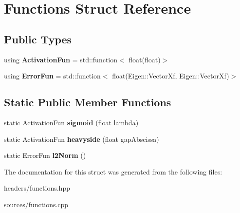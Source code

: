 \hypertarget{structFunctions}{}\section{Functions Struct Reference}
\label{structFunctions}
\subsection*{Public Types}
\begin{DoxyCompactItemize}
\item 
\mbox{\label{structFunctions_ad25362ffa52b2f7933431190546593ac}} 
using {\bfseries Activation\+Fun} = std\+::function$<$ float(float)$>$
\item 
\mbox{\label{structFunctions_a834bc4170f1caa8c77272ecf51dbae5c}} 
using {\bfseries Error\+Fun} = std\+::function$<$ float(Eigen\+::\+Vector\+Xf, Eigen\+::\+Vector\+Xf)$>$
\end{DoxyCompactItemize}
\subsection*{Static Public Member Functions}
\begin{DoxyCompactItemize}
\item 
\mbox{\label{structFunctions_a773de9cd59f7ccc3e2fe9822f0536ae4}} 
static Activation\+Fun {\bfseries sigmoid} (float lambda)
\item 
\mbox{\label{structFunctions_a683c495693f3e2a5ec55e30edaccfd2d}} 
static Activation\+Fun {\bfseries heavyside} (float gap\+Abscissa)
\item 
\mbox{\label{structFunctions_a00bac40f42bb6c47d25c0cd238c4275a}} 
static Error\+Fun {\bfseries l2\+Norm} ()
\end{DoxyCompactItemize}


The documentation for this struct was generated from the following files\+:\begin{DoxyCompactItemize}
\item 
headers/functions.\+hpp\item 
sources/functions.\+cpp\end{DoxyCompactItemize}
